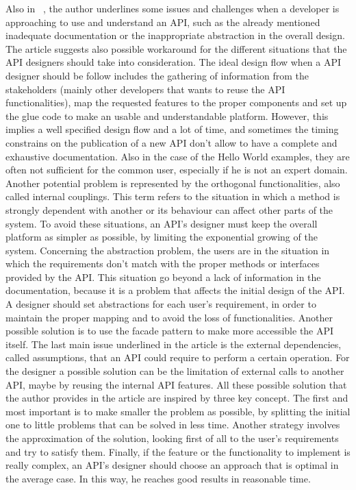 Also in ~\cite{by_christopher_scaffidi_why_2006}, the author underlines some issues and challenges when a developer is approaching to use and understand an API, such as the already mentioned inadequate documentation or the inappropriate abstraction in the overall design. The article suggests also possible workaround for the different situations that the API designers should take into consideration. The ideal design flow when a API designer should be follow includes the gathering of information from the stakeholders (mainly other developers that wants to reuse the API functionalities), map the requested features to the proper components and set up the glue code to make an usable and understandable platform. However, this implies a well specified design flow and a lot of time, and sometimes the timing constrains on the publication of a new API don't allow to have a complete and exhaustive documentation. Also in the case of the Hello World examples, they are often not sufficient for the common user, especially if he is not an expert domain. Another potential problem is represented by the orthogonal functionalities, also called internal couplings. This term refers to the situation in which a method is strongly dependent with another or its behaviour can affect other parts of the system. To avoid these situations, an API's designer must keep the overall platform as simpler as possible, by limiting the exponential growing of the system. Concerning the abstraction problem, the users are in the situation in which the requirements don't match with the proper methods or interfaces provided by the API. This situation go beyond a lack of information in the documentation, because it is a problem that affects the initial design of the API. A designer should set abstractions for each user's requirement, in order to maintain the proper mapping and to avoid the loss of functionalities. Another possible solution is to use the facade pattern to make more accessible the API itself. The last main issue underlined in the article is the external dependencies, called assumptions, that an API could require to perform a certain operation. For the designer a possible solution can be the limitation of external calls to another API, maybe by reusing the internal API features. \newline
All these possible solution that the author provides in the article are inspired by three key concept. The first and most important is to make smaller the problem as possible, by splitting the initial one to little problems that can be solved in less time. Another strategy involves the approximation of the solution, looking first of all to the user's requirements and try to satisfy them. Finally, if the feature or the functionality to implement is really complex, an API's designer should choose an approach that is optimal in the average case. In this way, he reaches good results in reasonable time.\newline
